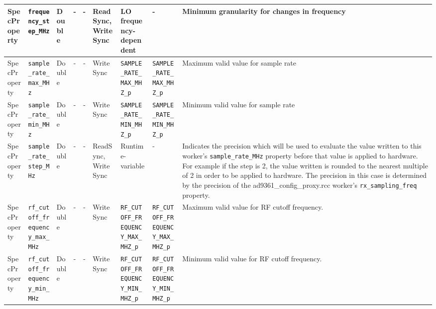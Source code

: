 \documentclass{article}
\begin{document}
\begin{landscape}
\begin{scriptsize}
\begin{longtable}{|p{1.8cm}|p{4.1cm}|p{1cm}|c|c|p{1.6cm}|p{3.7cm}|p{3.7cm}|p{2.5cm}|}
			\hline
			SpecProperty & \verb+frequency_step_MHz+           & Double& -        & -          & ReadSync, WriteSync & LO frequency-dependent & - & Minimum granularity for changes in frequency                                                                                                                                                                                \\
			\hline
			SpecProperty & \verb+sample_rate_max_MHz+          & Double& -        & -          & WriteSync & \verb+SAMPLE_RATE_MAX_MHZ_p+ & \verb+SAMPLE_RATE_MAX_MHZ_p+ & Maximum valid value for sample rate                                                                                                                                                                                         \\
			\hline
			SpecProperty & \verb+sample_rate_min_MHz+          & Double& -        & -          & WriteSync & \verb+SAMPLE_RATE_MIN_MHZ_p+ & \verb+SAMPLE_RATE_MIN_MHZ_p+ & Minimum valid value for sample rate                                                                                                                                                                                         \\
			\hline
			SpecProperty & \verb+sample_rate_step_MHz+         & Double& -        & -          & ReadSync, WriteSync & Runtime-variable & - & Indicates the precision which will be used to evaluate the value written
        to this worker's \verb+sample_rate_MHz+ property
        before that value is applied to hardware. For example if the step is 2,
        the value written is rounded to the nearest multiple of 2 in order to
        be applied to hardware. The precision in this case is determined by the
        precision of the ad9361\_config\_proxy.rcc worker's
        \verb+rx_sampling_freq+ property.                                                                                                                                                                              \\
			\hline
			SpecProperty & \verb+rf_cutoff_frequency_max_MHz+  & Double& -        & -          & WriteSync      & \verb+RF_CUTOFF_FREQUENCY_MAX_MHZ_p+ & \verb+RF_CUTOFF_FREQUENCY_MAX_MHZ_p+ & Maximum valid value for RF cutoff frequency. \\
			\hline
			SpecProperty & \verb+rf_cutoff_frequency_min_MHz+  & Double& -        & -          & WriteSync      & \verb+RF_CUTOFF_FREQUENCY_MIN_MHZ_p+ & \verb+RF_CUTOFF_FREQUENCY_MIN_MHZ_p+  & Minimum valid value for RF cutoff frequency. \\

\end{longtable}
\end{scriptsize}
\end{landscape}
\end{document}

